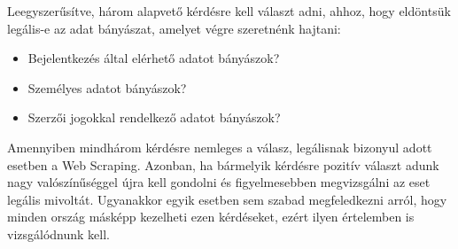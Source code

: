 Leegyszerűsítve, három alapvető kérdésre kell választ adni, ahhoz, hogy eldöntsük legális-e az adat bányászat, amelyet végre szeretnénk hajtani: 

\begin{itemize}
    \item Bejelentkezés által elérhető adatot bányászok?
    \item Személyes adatot bányászok?
    \item Szerzői jogokkal rendelkező adatot bányászok?
\end{itemize}

Amennyiben mindhárom kérdésre nemleges a válasz, legálisnak bizonyul adott esetben a Web Scraping. Azonban, ha bármelyik kérdésre pozitív választ adunk nagy valószínűséggel újra kell gondolni és figyelmesebben megvizsgálni az eset legális mivoltát. Ugyanakkor egyik esetben sem szabad megfeledkezni arról, hogy minden ország másképp kezelheti ezen kérdéseket, ezért ilyen értelemben is vizsgálódnunk kell.